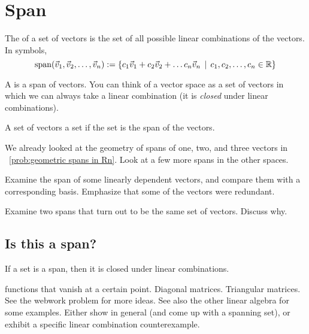 \section{Span}

\begin{definition}
  The  of a set of vectors is the set of all
  possible linear combinations of the vectors.  In symbols,
  \begin{equation*}
    \operatorname{span}(\vec v_1, \vec v_2, \ldots, \vec v_n) := \{c_1\vec
    v_1+c_2\vec v_2+\ldots c_n\vec v_n \,\mid\, c_1,c_2,\ldots,c_n\in\mathbb{R}\}
  \end{equation*}

  A  is a span of vectors.  You can think
  of a vector space as a set of vectors in which we can always take a
  linear combination (it is \emph{closed} under linear combinations).

  A set of vectors  a set if the set is the span of the
  vectors.
\end{definition}

\begin{problemtodo}
  We already looked at the geometry of spans of one, two, and three
  vectors in \Prob~\ref{prob:geometric spans in Rn}.  Look at a few
  more spans in the other spaces.
\end{problemtodo}

\begin{problemtodo}
  Examine the span of some linearly dependent vectors, and compare
  them with a corresponding basis.  Emphasize that some of the vectors
  were redundant.
\end{problemtodo}

\begin{problemtodo}
  Examine two spans that turn out to be the same set of vectors.
  Discuss why.
\end{problemtodo}

\subsection{Is this a span?}
\label{sec:this-span}

If a set is a span, then it is closed under linear combinations.

\begin{problemtodo}
  functions that vanish at a certain point.  Diagonal matrices.
  Triangular matrices.  See the webwork problem for more ideas.  See
  also the other linear algebra for some examples.  Either show in
  general (and come up with a spanning set), or exhibit a specific
  linear combination counterexample.
\end{problemtodo}


